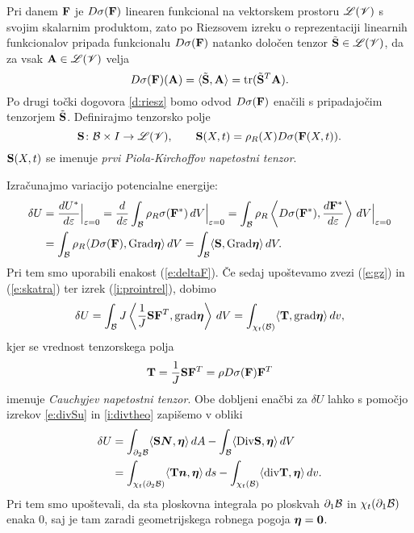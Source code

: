 Pri danem $\mathbf F$ je $D\sigma(\mathbf F)$ linearen funkcional
na vektorskem prostoru $\mathscr L(\mathscr V)$ s svojim skalarnim produktom, zato po Riezsovem izreku
o reprezentaciji linearnih funkcionalov pripada funkcionalu $D\sigma(\mathbf F)$ natanko
določen tenzor $\tilde{\mathbf S}\in\mathscr L(\mathscr V)$, da za vsak $\mathbf A\in\mathscr L(\mathscr V)$ velja
\[ D\sigma(\mathbf F)(\mathbf A)=\langle\tilde{\mathbf S},\mathbf A\rangle=\mathrm{tr}(\tilde{\mathbf S}^{T}\mathbf A). \]
Po drugi točki dogovora \ref{d:riesz}
bomo odvod $D\sigma(\mathbf F)$ enačili s pripadajočim tenzorjem $\tilde{\mathbf S}$.
Definirajmo tenzorsko polje
\begin{equation} \label{e:piola}
	\ten{S}\colon \B\times I\to\L(\V),\qquad
	\ten{S}(X,t)=\rho_R(X)D\sigma(\ten{F}(X,t)).%
\end{equation}
$\mathbf S(X,t)$ se imenuje \emph{prvi Piola-Kirchoffov napetostni tenzor}.

Izračunajmo variacijo potencialne energije:
\begin{align*} 
	\delta U &=\frac{dU^*}{d\varepsilon}\Big|_{\varepsilon=0}=\frac{d}{d\varepsilon}
	\int_{\mathcal B}\rho_R \sigma(\mathbf F^*)\,dV \Big|_{\varepsilon=0} =
	\int_{\mathcal B}\rho_R \left< D\sigma(\mathbf F^*),\frac{d\mathbf F^*}{d\varepsilon}\right>\,dV \Big|_{\varepsilon=0} \\
	&= \int_{\mathcal B}\rho_R \langle D\sigma(\mathbf F),\mathrm{Grad}\boldsymbol \eta\rangle\,dV
	=\int_{\mathcal B}\langle\mathbf S,\mathrm{Grad}\boldsymbol \eta\rangle\,dV.
\end{align*}
Pri tem smo uporabili enakost (\ref{e:deltaF}). Če sedaj upoštevamo zvezi (\ref{e:gz}) in
(\ref{e:skatra}) ter izrek (\ref{i:prointrel}), dobimo
\begin{align*} 
	\delta U = \int_{\mathcal B}J\left<\frac{1}{J}\mathbf S\mathbf F^{T},\mathrm{grad}\boldsymbol \eta\right>\,dV =
	\int_{\chi_t(\mathcal B)}\langle\mathbf T,\mathrm{grad}\boldsymbol \eta\rangle\,dv,
\end{align*}
kjer se vrednost tenzorskega polja
\begin{equation} \label{e:napetostni}
	\mathbf T=\frac{1}{J}\mathbf S\mathbf F^{T}=\rho D\sigma(\mathbf F)\mathbf F^{T}
\end{equation}
imenuje \emph{Cauchyjev napetostni tenzor}. Obe dobljeni enačbi za $\delta U$ lahko
s pomočjo izrekov \ref{e:divSu} in \ref{i:divtheo} zapišemo v obliki
\begin{align}
	\delta U &= \int_{\partial_2\mathcal B}\langle\mathbf S\boldsymbol N,\boldsymbol \eta\rangle\,dA-
	\int_{\mathcal B}\langle\mathrm {Div}\mathbf S,\boldsymbol \eta\rangle\,dV \label{e:vapoesr} \\
	&= \int_{\chi_t(\partial_2\mathcal B)}\langle\mathbf T\boldsymbol n,\boldsymbol \eta\rangle\,ds-
	\int_{\chi_t(\mathcal B)}\langle\mathrm{div}\mathbf T,\boldsymbol \eta\rangle\,dv. \label{e:vapoesp}
\end{align}
Pri tem smo upoštevali, da sta ploskovna integrala po ploskvah $\partial_1\mathcal B$ in
$\chi_t(\partial_1\mathcal B)$ enaka 0, saj je tam zaradi geometrijskega robnega pogoja $\boldsymbol \eta=\boldsymbol 0$.

